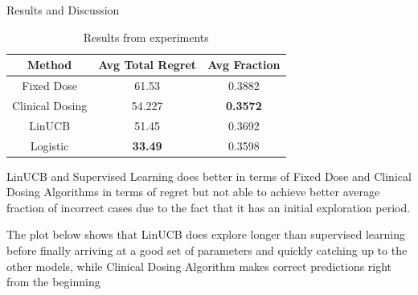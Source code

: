 \documentclass[final, 14pt]{beamer}
\newlength{\onecolwid}
\newlength{\twocolwid}
\begin{document}
\begin{frame}[t]
\begin{columns}[t]
\begin{column}{\twocolwid}
\begin{columns}[t,totalwidth=\twocolwid]
\begin{column}{\onecolwid}
\begin{block}{Results and Discussion}
\vspace{.5in}

\begin{table}[h]
	\label{results}
	\centering
	\begin{tabular}{ccc}
					\toprule
					Method          & Avg Total Regret & Avg Fraction    \\
					\midrule
					Fixed Dose      & 61.53            & 0.3882          \\
					Clinical Dosing & 54.227           & \textbf{0.3572} \\
					LinUCB          & 51.45            & 0.3692          \\
					Logistic        & \textbf{33.49}   & 0.3598    	\\
					\bottomrule
	\end{tabular}
	\caption{Results from experiments}
\end{table}

LinUCB and Supervised Learning does better in terms of Fixed Dose and Clinical Dosing Algorithms in terms of regret but not able to achieve better average fraction of incorrect cases due to the fact that it has an initial exploration period. 

The plot below shows that LinUCB does explore longer than supervised learning before finally arriving at a good set of parameters and quickly catching up to the other models, while  Clinical Dosing Algorithm makes correct predictions right from the beginning

\end{block}


\end{column} %

\end{columns} %



\begin{columns}[t,totalwidth=\twocolwid] %


\end{columns}
\end{column}
\end{columns}
\end{frame}
\end{document}
